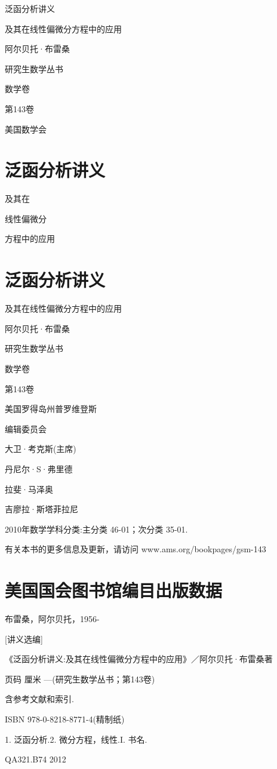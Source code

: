 \documentclass[10pt,b5paper,openany,twoside]{ctexbook}
\begin{document}
泛函分析讲义

及其在线性偏微分方程中的应用

阿尔贝托·布雷桑

研究生数学丛书

数学卷

第143卷

美国数学会

\section*{泛函分析讲义}

及其在

线性偏微分

方程中的应用

\section*{泛函分析讲义}

及其在线性偏微分方程中的应用

阿尔贝托·布雷桑

研究生数学丛书

数学卷

第143卷

美国罗得岛州普罗维登斯

编辑委员会

大卫·考克斯(主席)

丹尼尔·S·弗里德

拉斐·马泽奥

吉廖拉·斯塔菲拉尼

2010年数学学科分类:主分类 46-01；次分类 35-01.

有关本书的更多信息及更新，请访问 www.ams.org/bookpages/gsm-143

\section*{美国国会图书馆编目出版数据}

布雷桑，阿尔贝托，1956-

[讲义选编]

《泛函分析讲义:及其在线性偏微分方程中的应用》／阿尔贝托·布雷桑著

页码 厘米 —(研究生数学丛书；第143卷)

含参考文献和索引.

ISBN 978-0-8218-8771-4(精制纸)

1. 泛函分析.2. 微分方程，线性.I. 书名.

QA321.B74 2012
\end{document}
